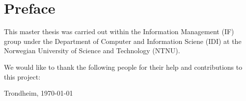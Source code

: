 \section*{Preface}
	\vspace{1cm}
	This master thesis was carried out within the Information Management (IF) 
	group under the Department of Computer and Information Sciene (IDI) 
	at the Norwegian University of Science and Technology (NTNU).
	
	\vspace{2cm}
	\noindent
	We would like to thank the following people for their help and contributions to this project:
	
	\vfill
	
	\hfill \thesisAuthor
	
	\hfill Trondheim, \today
%	
%	
%	
